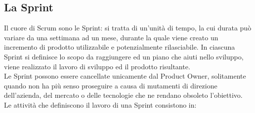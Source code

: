 \subsection{La Sprint}
Il cuore di Scrum sono le Sprint: si tratta di un'unità di tempo, la cui durata può variare da una settimana ad un mese, durante la quale viene creato un incremento di prodotto utilizzabile e potenzialmente rilasciabile. In ciascuna Sprint si definisce lo scopo da raggiungere ed un piano che aiuti nello sviluppo, viene realizzato il lavoro di sviluppo ed il prodotto risultante.
\\
Le Sprint possono essere cancellate unicamente dal Product Owner, solitamente quando non ha più senso proseguire a causa di mutamenti di direzione dell'azienda, del mercato o delle tecnologie che ne rendano obsoleto l'obiettivo.
\\
Le attività che definiscono il lavoro di una Sprint consistono in:
